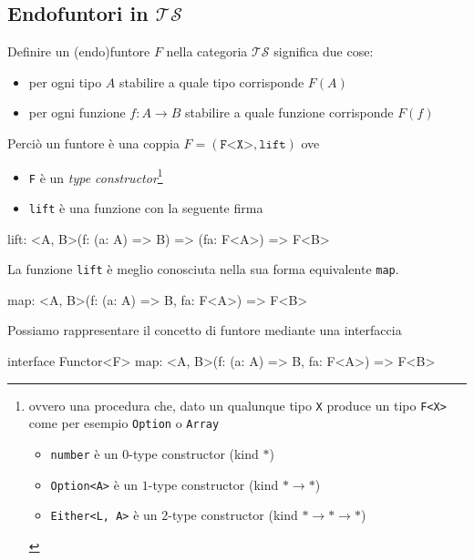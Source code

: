 \documentclass[12pt]{article}
\theoremstyle{definition}
\newenvironment{code}
  {\vspace{0.5cm} \VerbatimEnvironment\begin{typescriptcode}}
  {\end{typescriptcode} \vspace{0.2cm}}
\begin{document}
\subsection{Endofuntori in $\mathcal{TS}$}

Definire un (endo)funtore $F$ nella categoria $\mathcal{TS}$ significa due cose:

\begin{itemize}
  \item per ogni tipo $A$ stabilire a quale tipo corrisponde $F(A)$
  \item per ogni funzione $f: A \rightarrow B$ stabilire a quale funzione corrisponde $F(f)$
\end{itemize}

Perciò un funtore è una coppia $F = (\texttt{F<X>}, \texttt{lift})$ ove

\begin{itemize}
  \item \texttt{F} è un \emph{type constructor}\footnote{
    ovvero una procedura che, dato un qualunque tipo \texttt{X} produce un tipo \texttt{F<X>} come per esempio \texttt{Option} o \texttt{Array}
    \begin{itemize}
      \item \texttt{number} è un $0$-type constructor (kind $*$)
      \item \texttt{Option<A>} è un $1$-type constructor (kind $* \rightarrow *$)
      \item \texttt{Either<L, A>} è un $2$-type constructor (kind $* \rightarrow * \rightarrow *$)
    \end{itemize}
  }
  \item \texttt{lift} è una funzione con la seguente firma
\end{itemize}

\begin{code}
lift: <A, B>(f: (a: A) => B) => (fa: F<A>) => F<B>
\end{code}

La funzione \texttt{lift} è meglio conosciuta nella sua forma equivalente \texttt{map}.

\begin{code}
map: <A, B>(f: (a: A) => B, fa: F<A>) => F<B>
\end{code}

Possiamo rappresentare il concetto di funtore mediante una interfaccia

\begin{code}
interface Functor<F> {
  map: <A, B>(f: (a: A) => B, fa: F<A>) => F<B>
}
\end{code}
\end{document}
